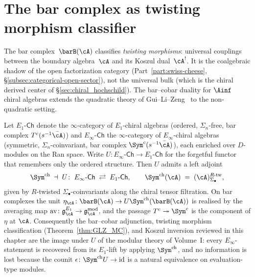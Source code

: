 \section{The bar complex as twisting morphism classifier}
\label{sec:bar_cobar}

The bar complex~$\barB(\cA)$ classifies \emph{twisting morphisms}:
universal couplings between the boundary algebra~$\cA$ and its
Koszul dual~$\cA^!$. It is the coalgebraic shadow of the open
factorization category (Part~\ref{part:swiss-cheese},
\S\ref{subsec:categorical-open-sector}), not the universal bulk
(which is the chiral derived center of
\S\ref{sec:chiral_hochschild}). The bar--cobar duality for $\Ainf$
chiral algebras extends the quadratic theory of
Gui--Li--Zeng~\cite{GLZ22} to the non-quadratic setting.

\begin{proposition}
\label{prop:bar-cobar-e1-primacy-adjunction}
Let $E_1\text{-}\mathsf{Ch}$ denote the $\infty$-category of $E_1$-chiral
algebras (ordered, $\Sigma_n$-free, bar complex $T^c(s^{-1}\bar\cA)$) and
$E_\infty\text{-}\mathsf{Ch}$ the $\infty$-category of $E_\infty$-chiral
algebras (symmetric, $\Sigma_n$-coinvariant, bar complex
$\Sym^c(s^{-1}\bar\cA)$), each enriched over $D$-modules on the
Ran space. Write $U\colon E_\infty\text{-}\mathsf{Ch} \to
E_1\text{-}\mathsf{Ch}$ for the forgetful functor that remembers only the
ordered structure. Then $U$ admits a left adjoint
\begin{equation}
\label{eq:sym-ch-U-adjunction}
\Sym^{\mathrm{ch}} \;\dashv\; U\colon\;
E_\infty\text{-}\mathsf{Ch} \;\rightleftarrows\; E_1\text{-}\mathsf{Ch},
\qquad
\Sym^{\mathrm{ch}}(\cA) \;=\; (\cA)_{\Sigma_\bullet}^{R\text{-tw}},
\end{equation}
given by $R$-twisted $\Sigma_\bullet$-coinvariants along the chiral
tensor filtration. On bar complexes the unit
$\eta_\cA\colon \barB(\cA) \to U\Sym^{\mathrm{ch}}(\barB(\cA))$
is realised by the averaging map
$\mathrm{av}\colon \mathfrak{g}^{E_1}_\cA \to
\mathfrak{g}^{\mathrm{mod}}_\cA$, and the passage
$T^c \twoheadrightarrow \Sym^c$ is the component of $\eta$ at
$\cA$. Consequently the bar--cobar adjunction, twisting morphism
classification (Theorem~\ref{thm:GLZ_MC}), and Koszul inversion
reviewed in this chapter are the image under $U$ of the modular
theory of Volume~I: every $E_\infty$-statement is recovered from
its $E_1$-lift by applying $\Sym^{\mathrm{ch}}$, and no information
is lost because the counit $\epsilon\colon \Sym^{\mathrm{ch}} U \to
\mathrm{id}$ is a natural equivalence on evaluation-type modules.
\end{proposition}

